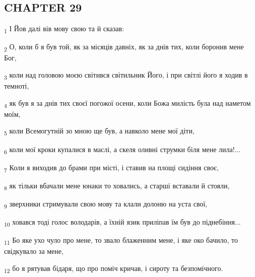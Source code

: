 \subsection{CHAPTER 29}
\begin{tcolorbox}
\textsubscript{1} І Йов далі вів мову свою та й сказав:
\end{tcolorbox}
\begin{tcolorbox}
\textsubscript{2} О, коли б я був той, як за місяців давніх, як за днів тих, коли боронив мене Бог,
\end{tcolorbox}
\begin{tcolorbox}
\textsubscript{3} коли над головою моєю світився світильник Його, і при світлі його я ходив в темноті,
\end{tcolorbox}
\begin{tcolorbox}
\textsubscript{4} як був я за днів тих своєї погожої осени, коли Божа милість була над наметом моїм,
\end{tcolorbox}
\begin{tcolorbox}
\textsubscript{5} коли Всемогутній зо мною ще був, а навколо мене мої діти,
\end{tcolorbox}
\begin{tcolorbox}
\textsubscript{6} коли мої кроки купалися в маслі, а скеля оливні струмки біля мене лила!...
\end{tcolorbox}
\begin{tcolorbox}
\textsubscript{7} Коли я виходив до брами при місті, і ставив на площі сидіння своє,
\end{tcolorbox}
\begin{tcolorbox}
\textsubscript{8} як тільки вбачали мене юнаки то ховались, а старші вставали й стояли,
\end{tcolorbox}
\begin{tcolorbox}
\textsubscript{9} зверхники стримували свою мову та клали долоню на уста свої,
\end{tcolorbox}
\begin{tcolorbox}
\textsubscript{10} ховався тоді голос володарів, а їхній язик приліпав їм був до піднебіння...
\end{tcolorbox}
\begin{tcolorbox}
\textsubscript{11} Бо яке ухо чуло про мене, то звало блаженним мене, і яке око бачило, то свідкувало за мене,
\end{tcolorbox}
\begin{tcolorbox}
\textsubscript{12} бо я рятував бідаря, що про поміч кричав, і сироту та безпомічного.
\end{tcolorbox}
